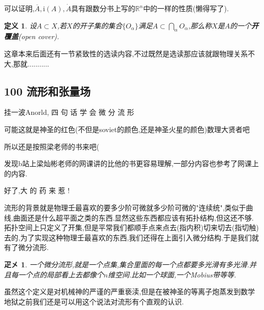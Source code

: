 \documentclass[UTF8]{article}
\newcommand{\im}{\mathrm{i}}
\begin{document}
	可以证明,$\overline{A}, \im(A), \dot{A}$具有跟数分书上写的$\mathbb{R}^n$中的一样的性质(懒得写了).
	
	\newtheorem*{openCover}{定义}
	
	\begin{openCover}
		设$A \subset X$,若$X$的开子集的集合$\{O_{\alpha}\}$满足$A \subset \bigcap_{\alpha} O_{\alpha}$,那么称$X$是$A$的一个\textbf{开覆盖}(open cover).
	\end{openCover}
	
	这章本来后面还有一节紧致性的选读内容,不过既然是选读那应该就跟物理关系不大,那就...........
	
	
	\newpage	
	
	
	
	
	
	
\subsection*{100 流形和张量场}
	
	挂一波Anorld, 四 句 话 学 会 微 分 流 形
	
	可能这就是神圣的红色(不但是soviet的颜色,还是神圣火星的颜色)数理大贤者吧
	
	所以还是按照梁老师的书来吧(
	
	发现b站上梁灿彬老师的网课讲的比他的书更容易理解,一部分内容也参考了网课上的内容.
	
	好了,大 的 药 来 惹 !
	
	流形的背景就是物理壬最喜欢的要多少阶可微就多少阶可微的"连续统",类似于曲线,曲面还是什么超平面之类的东西.显然这些东西都应该有拓扑结构,但这还不够.拓扑空间上只定义了开集,但是平常我们都顺手点来点去(指内积)切来切去(指切触)去的,为了实现这种物理壬最喜欢的东西,我们还得在上面引入微分结构.于是我们就有了微分流形.
	
	\newtheorem*{easyManifold}{疋㐅\cite{Hassani}}
	
	\begin{easyManifold}
		一个微分流形,就是一个点集,集合里面的每一个点都要多光滑有多光滑.并且每一个点的局部看上去都像个$n$维空间.比如一个球面,一个Mobius带等等.
	\end{easyManifold}
	
	虽然这个定义是对机械神的严谨的严重亵渎,但是在被神圣的等离子炮蒸发到数学地狱之前我们还是可以用这个说法对流形有个直观的认识.
	
	\newtheorem*{differentiableManifold}{定义}	
	
\end{document}
